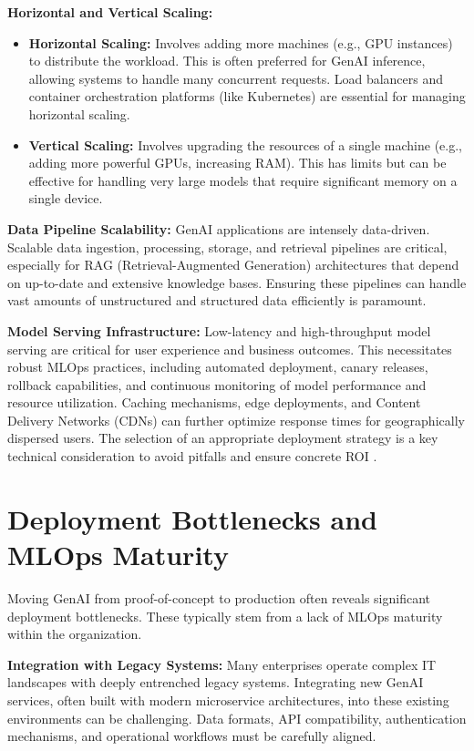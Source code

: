 \documentclass[10pt,twocolumn,letterpaper]{article}
\begin{document}
\textbf{Horizontal and Vertical Scaling:}
\begin{itemize}
  \item \textbf{Horizontal Scaling:} Involves adding more machines (e.g., GPU instances) to distribute the workload. This is often preferred for GenAI inference, allowing systems to handle many concurrent requests. Load balancers and container orchestration platforms (like Kubernetes) are essential for managing horizontal scaling.
  \item \textbf{Vertical Scaling:} Involves upgrading the resources of a single machine (e.g., adding more powerful GPUs, increasing RAM). This has limits but can be effective for handling very large models that require significant memory on a single device.
\end{itemize}

\textbf{Data Pipeline Scalability:} GenAI applications are intensely data-driven. Scalable data ingestion, processing, storage, and retrieval pipelines are critical, especially for RAG (Retrieval-Augmented Generation) architectures that depend on up-to-date and extensive knowledge bases. Ensuring these pipelines can handle vast amounts of unstructured and structured data efficiently is paramount.

\textbf{Model Serving Infrastructure:} Low-latency and high-throughput model serving are critical for user experience and business outcomes. This necessitates robust MLOps practices, including automated deployment, canary releases, rollback capabilities, and continuous monitoring of model performance and resource utilization. Caching mechanisms, edge deployments, and Content Delivery Networks (CDNs) can further optimize response times for geographically dispersed users. The selection of an appropriate deployment strategy is a key technical consideration to avoid pitfalls and ensure concrete ROI \cite{openalex_w4400993506}.


\section{Deployment Bottlenecks and MLOps Maturity}


Moving GenAI from proof-of-concept to production often reveals significant deployment bottlenecks. These typically stem from a lack of MLOps maturity within the organization.

\textbf{Integration with Legacy Systems:} Many enterprises operate complex IT landscapes with deeply entrenched legacy systems. Integrating new GenAI services, often built with modern microservice architectures, into these existing environments can be challenging. Data formats, API compatibility, authentication mechanisms, and operational workflows must be carefully aligned.
\end{document}
